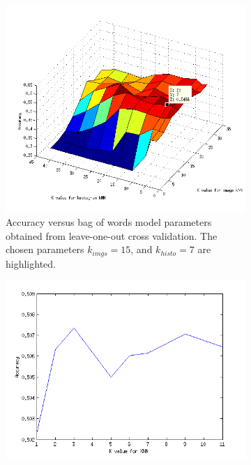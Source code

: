 \documentclass{article} %
\begin{document}
\begin{figure}[htb]
\centering
	\begin{subfigure}[t]{0.33\textwidth}
		\centering
		\includegraphics[width = \textwidth]{./img/pickK_final}
		\parbox{.95\textwidth}{\caption{Accuracy versus bag of words model parameters obtained from leave-one-out cross validation. The chosen parameters $k_{imgs} = 15$, and $k_{histo} = 7$ are highlighted. \label{fig:Kbag} }}
			\end{subfigure}
	\begin{subfigure}[t]{0.33\textwidth}
		\centering
		\includegraphics[width = \textwidth]{./img/kforest}

\end{subfigure}
\end{figure}
\end{document}
